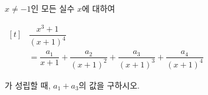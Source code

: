\hspace*{2mm}\begin{minipage}[t]{\dimexpr\linewidth-2mm\relax}\vspace{0pt}
$x\ne -1$인 모든 실수 $x$에 대하여 \par\smallskip\noindent\hspace*{1.5em}$\begin{aligned}[t] &\dfrac{x^3+1}{(x+1)^4}\\ &=\dfrac{a_1}{x+1}+\dfrac{a_2}{(x+1)^2}+\dfrac{a_3}{(x+1)^3}+\dfrac{a_4}{(x+1)^4} \end{aligned}$\par\smallskip\noindent 가 성립할 때, $a_1+a_3$의 값을 구하시오. \end{minipage}
